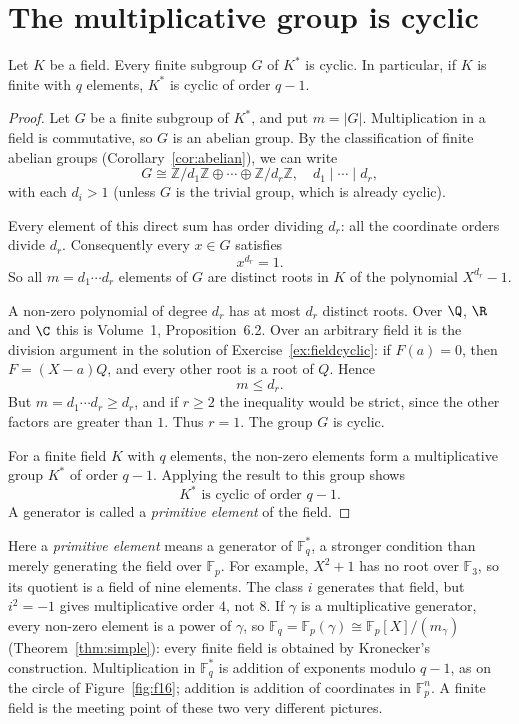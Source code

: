 \section{The multiplicative group is cyclic}

\begin{theorem}\label{thm:cyclicmult}
Let $K$ be a field. Every finite subgroup $G$ of $K^*$ is cyclic. In particular, if $K$ is finite with $q$ elements, $K^*$ is cyclic of order $q-1$.
\end{theorem}
\begin{proof}
Let $G$ be a finite subgroup of
$K^*$, and put $m=|G|$.
Multiplication in a field is
commutative, so $G$ is an abelian group.
By the classification of finite
abelian groups (Corollary~\ref{cor:abelian}),
we can write
\[
G\cong
\mathbb Z/d_1\mathbb Z\oplus\cdots
\oplus\mathbb Z/d_r\mathbb Z,
\quad d_1\mid\cdots\mid d_r,
\]
with each $d_i>1$ (unless $G$ is
the trivial group, which is already cyclic).

Every element of this direct sum
has order dividing $d_r$: all the
coordinate orders divide $d_r$.
Consequently every $x\in G$
satisfies
\[
x^{d_r}=1.
\]
So all $m=d_1\cdots d_r$ elements
of $G$ are distinct roots in $K$
of the polynomial $X^{d_r}-1$.

A non-zero polynomial of degree $d_r$
has at most $d_r$
distinct roots. Over $\Q$, $\R$ and $\C$ this is Volume~1, Proposition~6.2. Over an arbitrary field it is the division argument in the solution of Exercise~\ref{ex:fieldcyclic}: if $F(a)=0$, then $F=(X-a)Q$, and every other root is a root of $Q$. Hence
\[
m\le d_r.
\]
But $m=d_1\cdots d_r\ge d_r$,
and if $r\ge2$ the inequality would
be strict, since the other factors
are greater than $1$. Thus $r=1$.
The group $G$ is cyclic.

For a finite field $K$ with $q$
elements, the non-zero elements
form a multiplicative group $K^*$
of order $q-1$. Applying the result
to this group shows
\[
\boxed{K^*\text{ is cyclic of order }q-1}.
\]
A generator is called a
\emph{primitive element} of the field.
\end{proof}

Here a \emph{primitive element} means a generator of $\mathbb F_q^*$,
a stronger condition than merely generating the field over $\mathbb F_p$.
For example, $X^2+1$ has no root over $\mathbb F_3$, so its quotient
is a field of nine elements. The class $i$ generates that field, but
$i^2=-1$ gives multiplicative order $4$, not $8$. If $\gamma$ is a multiplicative generator, every non-zero element is a power of $\gamma$, so $\mathbb F_q=\mathbb F_p(\gamma)\cong\mathbb F_p[X]/(m_\gamma)$ (Theorem~\ref{thm:simple}): every finite field is obtained by Kronecker's construction. Multiplication in $\mathbb F_q^*$ is addition of exponents modulo $q-1$, as on the circle of Figure~\ref{fig:f16}; addition is addition of coordinates in $\mathbb F_p^n$. A finite field is the meeting point of these two very different pictures.

